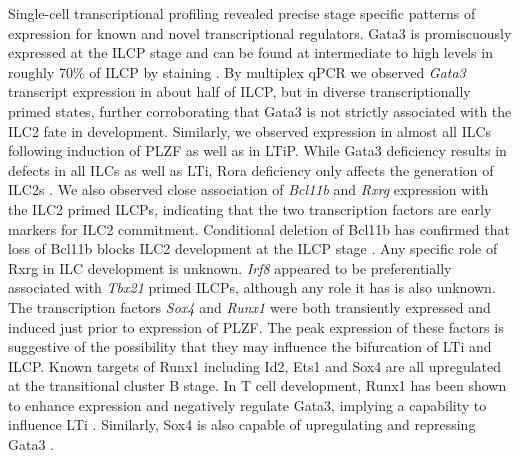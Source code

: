 Single-cell transcriptional profiling revealed precise stage specific patterns of expression for known and novel transcriptional regulators. Gata3 is promiscuously expressed at the ILCP stage and can be found at intermediate to high levels in roughly 70\% of ILCP by staining \cite{constantinides2014}. By multiplex qPCR we observed \textit{Gata3} transcript expression in about half of ILCP, but in diverse transcriptionally primed states, further corroborating that Gata3 is not strictly associated with the ILC2 fate in development. Similarly, we observed \textit{\Rora} expression in almost all ILCs following induction of PLZF as well as in LTiP. While Gata3 deficiency results in defects in all ILCs as well as LTi, Rora deficiency only affects the generation of ILC2s \cite{halim2012}. We also observed close association of \textit{Bcl11b} and \textit{Rxrg} expression with the ILC2 primed ILCPs, indicating that the two transcription factors are early markers for ILC2 commitment. Conditional deletion of Bcl11b has confirmed that loss of Bcl11b blocks ILC2 development at the ILCP stage \cite{yu2016}. Any specific role of Rxrg in ILC development is unknown. \textit{Irf8} appeared to be preferentially associated with \textit{Tbx21} primed ILCPs, although any role it has is also unknown. The transcription factors \textit{Sox4} and \textit{Runx1} were both transiently expressed and induced just prior to expression of PLZF. The peak expression of these factors is suggestive of the possibility that they may influence the bifurcation of LTi and ILCP. Known targets of Runx1 including Id2, Ets1 and Sox4 are all upregulated at the transitional cluster B stage. In T cell development, Runx1 has been shown to enhance \RORgt{} expression and negatively regulate Gata3, implying a capability to influence LTi \cite{lazarevic2011}. Similarly, Sox4 is also capable of upregulating \RORgt{} and repressing Gata3 \cite{kuwahara2012}.

